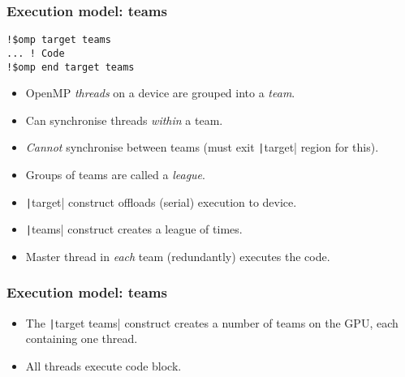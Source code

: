 \documentclass{beamer}
\begin{document}
\begin{frame}[fragile]
\frametitle{Execution model: teams}

\begin{verbatim}
!$omp target teams 
... ! Code
!$omp end target teams
\end{verbatim}

\begin{itemize}
  \item OpenMP \emph{threads} on a device are grouped into a \emph{team}.
  \item Can synchronise threads \emph{within} a team.
  \item \emph{Cannot} synchronise between teams (must exit \texttt|target| region for this).
  \item Groups of teams are called a \emph{league}.
  \item \texttt|target| construct offloads (serial) execution to device.
  \item \texttt|teams| construct creates a league of times.
  \item Master thread in \emph{each} team (redundantly) executes the code.
\end{itemize}

\end{frame}

\begin{frame}
\frametitle{Execution model: teams}
\begin{itemize}
  \item The \texttt|target teams| construct creates a number of teams on the GPU, each containing one thread.
  \item All threads execute code block.
\end{itemize}

\begin{center}
\end{center}
\end{frame}
\end{document}
